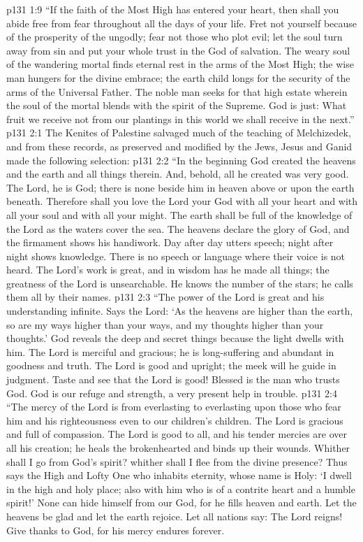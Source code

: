 \vs p131 1:9 “If the faith of the Most High has entered your heart, then shall you abide free from fear throughout all the days of your life. Fret not yourself because of the prosperity of the ungodly; fear not those who plot evil; let the soul turn away from sin and put your whole trust in the God of salvation. The weary soul of the wandering mortal finds eternal rest in the arms of the Most High; the wise man hungers for the divine embrace; the earth child longs for the security of the arms of the Universal Father. The noble man seeks for that high estate wherein the soul of the mortal blends with the spirit of the Supreme. God is just: What fruit we receive not from our plantings in this world we shall receive in the next.”
\vs p131 2:1 The Kenites of Palestine salvaged much of the teaching of Melchizedek, and from these records, as preserved and modified by the Jews, Jesus and Ganid made the following selection:
\pc \vs p131 2:2 “In the beginning God created the heavens and the earth and all things therein. And, behold, all he created was very good. The Lord, he is God; there is none beside him in heaven above or upon the earth beneath. Therefore shall you love the Lord your God with all your heart and with all your soul and with all your might. The earth shall be full of the knowledge of the Lord as the waters cover the sea. The heavens declare the glory of God, and the firmament shows his handiwork. Day after day utters speech; night after night shows knowledge. There is no speech or language where their voice is not heard. The Lord’s work is great, and in wisdom has he made all things; the greatness of the Lord is unsearchable. He knows the number of the stars; he calls them all by their names.
\vs p131 2:3 “The power of the Lord is great and his understanding infinite. Says the Lord: ‘As the heavens are higher than the earth, so are my ways higher than your ways, and my thoughts higher than your thoughts.’ God reveals the deep and secret things because the light dwells with him. The Lord is merciful and gracious; he is long\hyp{}suffering and abundant in goodness and truth. The Lord is good and upright; the meek will he guide in judgment. Taste and see that the Lord is good! Blessed is the man who trusts God. God is our refuge and strength, a very present help in trouble.
\vs p131 2:4 “The mercy of the Lord is from everlasting to everlasting upon those who fear him and his righteousness even to our children’s children. The Lord is gracious and full of compassion. The Lord is good to all, and his tender mercies are over all his creation; he heals the brokenhearted and binds up their wounds. Whither shall I go from God’s spirit? whither shall I flee from the divine presence? Thus says the High and Lofty One who inhabits eternity, whose name is Holy: ‘I dwell in the high and holy place; also with him who is of a contrite heart and a humble spirit!’ None can hide himself from our God, for he fills heaven and earth. Let the heavens be glad and let the earth rejoice. Let all nations say: The Lord reigns! Give thanks to God, for his mercy endures forever.
